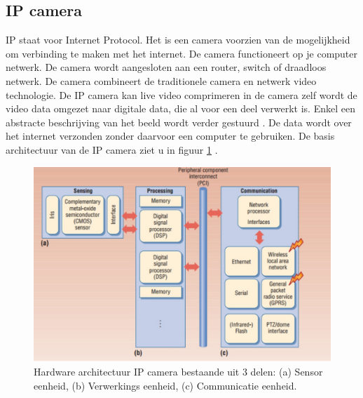 \subsection{IP camera}
\label{refIPC}
IP staat voor Internet Protocol. Het is een camera voorzien van de mogelijkheid om verbinding te maken met het internet. De camera functioneert op je computer netwerk. De camera wordt aangesloten aan een router, switch of draadloos netwerk.  De camera combineert de traditionele camera en netwerk video technologie. De IP camera kan live video comprimeren in de camera zelf wordt de video data omgezet naar digitale data, die al voor een deel verwerkt is. Enkel een abstracte beschrijving van het beeld wordt verder gestuurd \cite{bibIPC3}.  De data wordt over het internet verzonden zonder daarvoor een computer te gebruiken. De basis architectuur van de IP camera ziet u in figuur \ref{imgIPC} \cite{bibVTC2}.
\begin{figure}[hbp]
	\includegraphics[scale=0.55]{ArchitectuurIPCamera}
	\caption{Hardware architectuur IP camera bestaande uit 3 delen: (a) Sensor eenheid, (b) Verwerkings eenheid, (c) Communicatie eenheid.}
	\label{imgIPC}
\end{figure}
